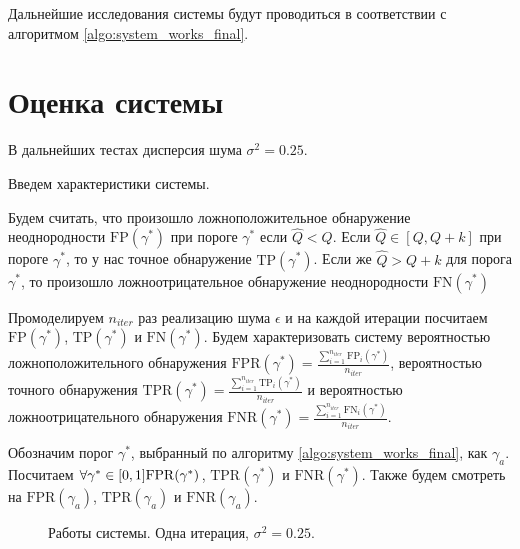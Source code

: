 \documentclass[specialist, substylefile = spbu.rtx,
			   subf, href, 12pt]{disser}
\begin{document}
Дальнейшие исследования системы будут проводиться в соответствии с алгоритмом \ref{algo:system_works_final}.

\section{Оценка системы}
В дальнейших тестах дисперсия шума $ \sigma^2 = 0.25 $. 

Введем характеристики системы.

Будем считать, что произошло ложноположительное обнаружение неоднородности $ \mathrm{FP}(\gamma^*) $ при пороге $ \gamma^* $ если $ \hat{Q} < Q $. Если $ \hat{Q} \in [Q, Q+k] $ при пороге $ \gamma^* $, то у нас точное обнаружение $ \mathrm{TP}(\gamma^*) $. Если же $ \hat{Q} > Q+k $ для порога $ \gamma^* $, то произошло ложноотрицательное обнаружение неоднородности $ \mathrm{FN}(\gamma^*) $

Промоделируем $ n_{iter} $ раз реализацию шума $ \epsilon $ и на каждой итерации посчитаем $ \mathrm{FP}(\gamma^*) $, $ \mathrm{TP}(\gamma^*) $ и $ \mathrm{FN}(\gamma^*) $. Будем характеризовать систему вероятностью ложноположительного обнаружения $ \mathrm{FPR}(\gamma^*) = \frac{\sum\limits_{i=1}^{n_{iter}}\mathrm{FP}_i(\gamma^*)}{n_{iter}} $, вероятностью точного обнаружения $ \mathrm{TPR}(\gamma^*) = \frac{\sum\limits_{i=1}^{n_{iter}}\mathrm{TP}_i(\gamma^*)}{n_{iter}} $ и вероятностью ложноотрицательного обнаружения $ \mathrm{FNR}(\gamma^*) = \frac{\sum\limits_{i=1}^{n_{iter}}\mathrm{FN}_i(\gamma^*)}{n_{iter}} $.

Обозначим порог $ \gamma^* $, выбранный по алгоритму \ref{algo:system_works_final}, как $ \gamma_a $. Посчитаем $ \forall \gamma^* \in [0, 1] \;\newline \mathrm{FPR}(\gamma^*)$, $ \mathrm{TPR}(\gamma^*) $ и $ \mathrm{FNR}(\gamma^*) $. Также будем смотреть на $ \mathrm{FPR}(\gamma_a)$, $ \mathrm{TPR}(\gamma_a) $ и $ \mathrm{FNR}(\gamma_a) $.

\begin{figure}[!hhh]
	\caption{Работы системы. Одна итерация, $ \sigma^2=0.25 $.}
	\label{pic:system_estimation_one_iter}
\end{figure}
\end{document}
